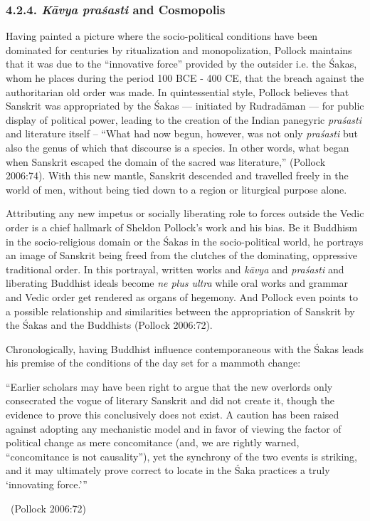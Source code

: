\vspace{-.3cm}

\subsubsection*{4.2.4. \textit{Kāvya praśasti} and Cosmopolis}

Having painted a picture where the socio-political conditions have been dominated for centuries by ritualization and monopolization, Pollock maintains that it was due to the “innovative force” provided by the outsider i.e. the Śakas, whom he places during the period 100 BCE - 400 CE, that the breach against the authoritarian old order was made. In quintessential style, Pollock believes that Sanskrit was appropriated by the Śakas — initiated by Rudradāman — for public display of political power, leading to the creation of the Indian panegyric \textit{praśasti} and literature itself – “What had now begun, however, was not only \textit{praśasti} but also the genus of which that discourse is a species. In other words, what began when Sanskrit escaped the domain of the sacred was literature,” (Pollock 2006:74). With this new mantle, Sanskrit descended and travelled freely in the world of men, without being tied down to a region or liturgical purpose alone.

Attributing any new impetus or socially liberating role to forces outside the Vedic order is a chief hallmark of Sheldon Pollock’s work and his bias. Be it Buddhism in the socio-religious domain or the Śakas in the socio-political world, he portrays an image of Sanskrit being freed from the clutches of the dominating, oppressive traditional order. In this portrayal, written works and \textit{kāvya} and \textit{praśasti} and liberating Buddhist ideals become \textit{ne plus ultra} while oral works and grammar and Vedic order get rendered as organs of hegemony. And Pollock even points to a possible relationship and similarities between the appropriation of Sanskrit by the Śakas and the Buddhists (Pollock 2006:72).

Chronologically, having Buddhist influence contemporaneous with the Śakas leads his premise of the conditions of the day set for a mammoth change:

\begin{myquote}
“Earlier scholars may have been right to argue that the new overlords only consecrated the vogue of literary Sanskrit and did not create it, though the evidence to prove this conclusively does not exist. A caution has been raised against adopting any mechanistic model and in favor of viewing the factor of political change as mere concomitance (and, we are rightly warned, “concomitance is not causality”), yet the synchrony of the two events is striking, and it may ultimately prove correct to locate in the Śaka practices a truly ‘innovating force.’” 

~\hfill (Pollock 2006:72)
\end{myquote}

